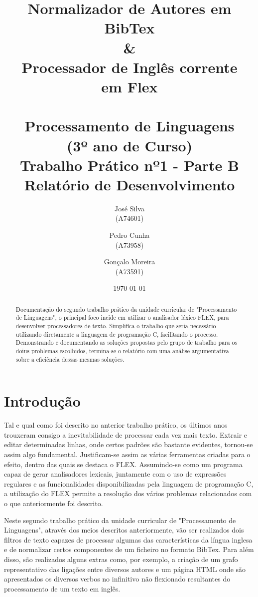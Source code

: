 \documentclass{report}
\title{ \textbf{Normalizador de Autores em BibTex}\\ 
\textbf{\&} \\
\textbf{Processador de Inglês corrente} \\ 
\textbf{em Flex} \\ \textbf{} \\
Processamento de Linguagens\\(3º ano de Curso)\\ 
\textbf{Trabalho Prático nº1 - Parte B}\\ Relatório de Desenvolvimento}
\author{José Silva\\ (A74601) \and Pedro Cunha\\ (A73958) \and Gonçalo Moreira\\ (A73591) }
\date{\today}
\begin{document}
\maketitle

\begin{abstract}
Documentação do segundo trabalho prático da unidade curricular de 
"Processamento de Linguagens", o principal foco incide em utilizar 
o analisador léxico FLEX, para desenvolver processadores de texto. 
Simplifica o trabalho que seria necessário utilizando diretamente a 
linguagem de programação C, facilitando o processo. 
Demonstrando e documentando as soluções propostas pelo grupo de 
trabalho para os doius problemas escolhidos, termina-se o relatório 
com uma análise argumentativa sobre a eficiência dessas mesmas soluções. 
\end{abstract}

\tableofcontents


\chapter{Introdução} \label{intro}
Tal e qual como foi descrito no anterior trabalho prático, os últimos 
anos trouxeram consigo a inevitabilidade de processar cada vez mais texto. 
Extrair e editar determinadas linhas, onde certos padrões são bastante 
evidentes, tornou-se assim algo fundamental. Justificam-se assim as várias 
ferramentas criadas para o efeito, dentro das quais se destaca o FLEX. 
Assumindo-se como um programa capaz de gerar analisadores lexicais, 
juntamente com o uso de expressões regulares e as funcionalidades 
disponibilizadas pela linguagem de programação C, a utilização do 
FLEX permite a resolução dos vários problemas relacionados com o que 
anteriormente foi descrito.


Neste segundo trabalho prático da unidade curricular de 
"Processamento de Linguagens", através dos meios descritos 
anteriormente, vão ser realizados dois filtros de texto capazes 
de processar algumas das características da língua inglesa e de 
normalizar certos componentes de um ficheiro no formato BibTex. 
Para além disso, são realizados alguns extras como, por exemplo, 
a criação de um grafo representativo das ligações entre diversos 
autores e um página HTML onde são apresentados os diversos verbos 
no infinitivo não flexionado resultantes do processamento de um 
texto em inglês.
\end{document}
